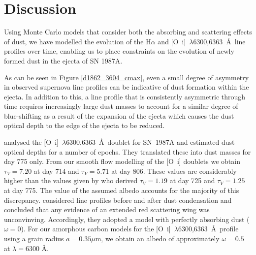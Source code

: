 \documentclass[useAMS,usenatbib,usegraphicx]{mnras}
\begin{document}
\section{Discussion}
\label{discuss}

Using Monte Carlo 
models that consider both the absorbing and scattering effects of dust, we have modelled the evolution of the H$\alpha$ and 
[O~{\sc i}]~$\lambda$6300,6363~\AA\ line profiles over time, enabling us to  place constraints on the 
evolution of newly formed dust in the ejecta of SN 1987A.  

As can be seen in Figure \ref{d1862_3604_cmax}, even a small degree of asymmetry in observed supernova line profiles can be indicative of dust formation within the ejecta.  In addition to this, a line profile that is consistently asymmetric through time requires increasingly large dust masses to account for a similar degree of blue-shifting as a result of the expansion of the ejecta which causes the dust optical depth to the edge of the ejecta to be reduced.

\citet{Lucy1989} analysed the [O~{\sc i}]~$\lambda$6300,6363~\AA\ doublet for SN~1987A and estimated dust optical depths for a number of epochs. They translated these into dust masses for day 775 only.  
From our smooth flow modelling of the [O~{\sc i}] doublets we obtain $\tau_V=7.20$ at day 714 and $\tau_V=5.71$ at day 806.  These values are considerably higher than the values given by \citet{Lucy1989} who derived $\tau_V=1.19$ at day 725 and $\tau_V=1.25$ at day 775.  The value of the assumed albedo accounts for the majority of this discrepancy.  \citet{Lucy1989} considered line profiles before and after dust condensation and concluded that any evidence of an extended red scattering wing was unconvinving.  Accordingly, they adopted a model with perfectly absorbing dust ($\omega = 0$).  For our amorphous carbon models for the [O~{\sc i}]~$\lambda$6300,6363~\AA\ profile using a grain radius $a=0.35\mu$m, we obtain an albedo of approximately $\omega = 0.5$ at $\lambda=6300$ \AA.  
\end{document}
